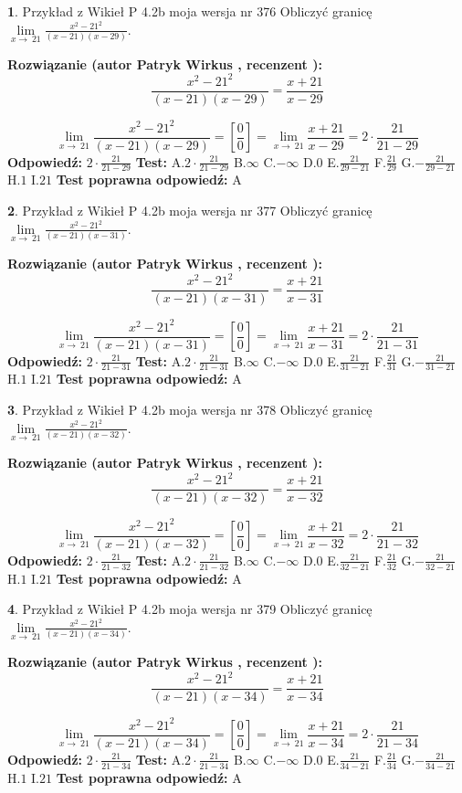 \documentclass[12pt, a4paper]{article}
\theoremstyle{definition} %
\newtheorem{zad}{}
\newcommand{\zadStart}[1]{\begin{zad}#1\newline}
\newcommand{\zadStop}{\end{zad}}
\newcommand{\rozwStart}[2]{\noindent \textbf{Rozwiązanie (autor #1 , recenzent #2): }\newline}
\newcommand{\rozwStop}{\newline}
\newcommand{\odpStart}{\noindent \textbf{Odpowiedź:}\newline}
\newcommand{\odpStop}{\newline}
\newcommand{\testStart}{\noindent \textbf{Test:}\newline}
\newcommand{\testStop}{\newline}
\newcommand{\kluczStart}{\noindent \textbf{Test poprawna odpowiedź:}\newline}
\newcommand{\kluczStop}{\newline}
\begin{document}
\zadStart{Przykład z Wikieł P 4.2b moja wersja nr 376}
Obliczyć granicę $\lim\limits_{x\to\ 21}\frac{x^{2}-21^{2}}{(x-21)(x-29)}$.
\zadStop
\rozwStart{Patryk Wirkus}{}
$$\frac{x^{2}-21^{2}}{(x-21)(x-29)}=\frac{x+21}{x-29}$$

$$\lim\limits_{x\to\ 21}\frac{x^{2}-21^{2}}{(x-21)(x-29)}=[\frac{0}{0}]=\lim\limits_{x\to\ 21}\frac{x+21}{x-29}=2 \cdot \frac{21}{21-29}$$
\rozwStop
\odpStart
$2 \cdot \frac{21}{21-29}$
\odpStop
\testStart
A.$2 \cdot \frac{21}{21-29}$
B.$\infty$
C.$-\infty$
D.$0$
E.$\frac{21}{29-21}$
F.$\frac{21}{29}$
G.$-\frac{21}{29-21}$
H.$1$
I.$21$
\testStop
\kluczStart
A
\kluczStop



\zadStart{Przykład z Wikieł P 4.2b moja wersja nr 377}
Obliczyć granicę $\lim\limits_{x\to\ 21}\frac{x^{2}-21^{2}}{(x-21)(x-31)}$.
\zadStop
\rozwStart{Patryk Wirkus}{}
$$\frac{x^{2}-21^{2}}{(x-21)(x-31)}=\frac{x+21}{x-31}$$

$$\lim\limits_{x\to\ 21}\frac{x^{2}-21^{2}}{(x-21)(x-31)}=[\frac{0}{0}]=\lim\limits_{x\to\ 21}\frac{x+21}{x-31}=2 \cdot \frac{21}{21-31}$$
\rozwStop
\odpStart
$2 \cdot \frac{21}{21-31}$
\odpStop
\testStart
A.$2 \cdot \frac{21}{21-31}$
B.$\infty$
C.$-\infty$
D.$0$
E.$\frac{21}{31-21}$
F.$\frac{21}{31}$
G.$-\frac{21}{31-21}$
H.$1$
I.$21$
\testStop
\kluczStart
A
\kluczStop



\zadStart{Przykład z Wikieł P 4.2b moja wersja nr 378}
Obliczyć granicę $\lim\limits_{x\to\ 21}\frac{x^{2}-21^{2}}{(x-21)(x-32)}$.
\zadStop
\rozwStart{Patryk Wirkus}{}
$$\frac{x^{2}-21^{2}}{(x-21)(x-32)}=\frac{x+21}{x-32}$$

$$\lim\limits_{x\to\ 21}\frac{x^{2}-21^{2}}{(x-21)(x-32)}=[\frac{0}{0}]=\lim\limits_{x\to\ 21}\frac{x+21}{x-32}=2 \cdot \frac{21}{21-32}$$
\rozwStop
\odpStart
$2 \cdot \frac{21}{21-32}$
\odpStop
\testStart
A.$2 \cdot \frac{21}{21-32}$
B.$\infty$
C.$-\infty$
D.$0$
E.$\frac{21}{32-21}$
F.$\frac{21}{32}$
G.$-\frac{21}{32-21}$
H.$1$
I.$21$
\testStop
\kluczStart
A
\kluczStop



\zadStart{Przykład z Wikieł P 4.2b moja wersja nr 379}
Obliczyć granicę $\lim\limits_{x\to\ 21}\frac{x^{2}-21^{2}}{(x-21)(x-34)}$.
\zadStop
\rozwStart{Patryk Wirkus}{}
$$\frac{x^{2}-21^{2}}{(x-21)(x-34)}=\frac{x+21}{x-34}$$

$$\lim\limits_{x\to\ 21}\frac{x^{2}-21^{2}}{(x-21)(x-34)}=[\frac{0}{0}]=\lim\limits_{x\to\ 21}\frac{x+21}{x-34}=2 \cdot \frac{21}{21-34}$$
\rozwStop
\odpStart
$2 \cdot \frac{21}{21-34}$
\odpStop
\testStart
A.$2 \cdot \frac{21}{21-34}$
B.$\infty$
C.$-\infty$
D.$0$
E.$\frac{21}{34-21}$
F.$\frac{21}{34}$
G.$-\frac{21}{34-21}$
H.$1$
I.$21$
\testStop
\kluczStart
A
\kluczStop
\end{document}
